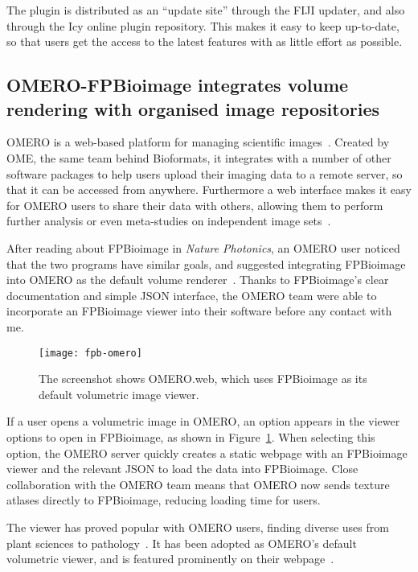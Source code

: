 The plugin is distributed as an ``update site'' through the FIJI updater, and also through the Icy online plugin repository. 
This makes it easy to keep up-to-date, so that users get the access to the latest features with as little effort as possible. 

\subsection{OMERO-FPBioimage integrates volume rendering with organised image repositories}
OMERO is a web-based platform for managing scientific images~\cite{moore2015omero}. 
Created by OME, the same team behind Bioformats, it integrates with a number of other software packages to help users upload their imaging data to a remote server, so that it can be accessed from anywhere. 
Furthermore a web interface makes it easy for OMERO users to share their data with others, allowing them to perform further analysis or even meta-studies on independent image sets~\cite{williams2017image}.

After reading about FPBioimage in \textit{Nature Photonics}, an OMERO user noticed that the two programs have similar goals, and suggested integrating FPBioimage into OMERO as the default volume renderer~\cite{ehrenfeuchter2017comment}. 
Thanks to FPBioimage's clear documentation and simple JSON interface, the OMERO team were able to incorporate an FPBioimage viewer into their software before any contact with me. 

\begin{figure}[htbp!]
\centering
\texttt{[image: fpb-omero]}
\caption[FPBioimage: OMERO.web uses FPBioimage as its default renderer for 3D data]{The screenshot shows OMERO.web, which uses FPBioimage as its default volumetric image viewer. } %
\label{fig:fpbOMERO}
\end{figure}

If a user opens a volumetric image in OMERO, an option appears in the viewer options to open in FPBioimage, as shown in Figure~\ref{fig:fpbOMERO}. 
When selecting this option, the OMERO server quickly creates a static webpage with an FPBioimage viewer and the relevant JSON to load the data into FPBioimage. 
Close collaboration with the OMERO team means that OMERO now sends texture atlases directly to FPBioimage, reducing loading time for users. 

The viewer has proved popular with OMERO users, finding diverse uses from plant sciences to pathology~\cite{fleur2018fpbioimage}.
It has been adopted as OMERO's default volumetric viewer, and is featured prominently on their webpage~\cite{omero2018website}.

